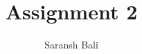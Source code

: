 \documentclass[journal,12pt,twocolumn]{IEEEtran}
\begin{document}
\makeatletter
{}
\makeatother
\let\StandardTheFigure\thefigure
\let\vec\mathbf
\renewcommand{\thefigure}{\theproblem}
\def\putbox#1#2#3{\makebox[0in][l]{\makebox[#1][l]{}\raisebox{\baselineskip}[0in][0in]{\raisebox{#2}[0in][0in]{#3}}}}
     \def\rightbox#1{\makebox[0in][r]{#1}}
     \def\centbox#1{\makebox[0in]{#1}}
     \def\topbox#1{\raisebox{-\baselineskip}[0in][0in]{#1}}
     \def\midbox#1{\raisebox{-0.5\baselineskip}[0in][0in]{#1}}
\vspace{3cm}
\title{Assignment 2}
\author{Saransh Bali}
%
%
%
% 
%
\end{document}
